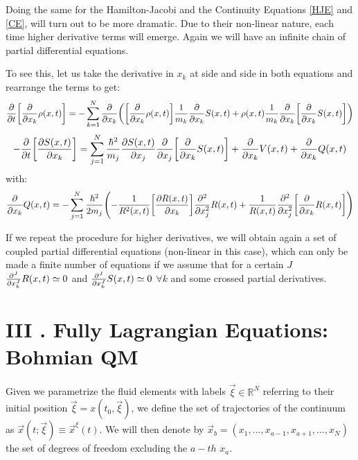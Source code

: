 \documentclass[11pt, a4paper]{article} %
\newcommand{\R}{\mathbb{R}} %
\begin{document}
Doing the same for the Hamilton-Jacobi and the Continuity Equations \eqref{HJE} and \eqref{CE}, will turn out to be more dramatic. Due to their non-linear nature, each time higher derivative terms will emerge. Again we will have an infinite chain of partial differential equations.

To see this, let us take the derivative in $x_k$ at side and side in both equations and rearrange the terms to get:
\begin{equation}
\pdv{}{t} \qty[\pdv{}{x_k}\rho(x,t)]=-\sum_{k=1}^N \pdv{}{x_k}\qty( \qty[ \pdv{}{x_k}\rho(x,t)]\frac{1}{m_k}\pdv{}{x_k} S(x,t)+\rho(x,t)\frac{1}{m_k}\pdv{}{x_k} \qty[\pdv{}{x_k}S(x,t)] )
\end{equation}
\begin{equation}
-\pdv{}{t}\qty[\pdv{S(x,t)}{x_k}] = \sum_{j=1}^N \frac{\hbar^2}{m_j}\pdv{S(x,t)}{x_j} \pdv{}{x_j}\qty[\pdv{}{x_k} S(x,t) ]+ \pdv{}{x_k}V(x,t)+\pdv{}{x_k}Q(x,t)
\end{equation}
with:
\begin{equation}
\pdv{}{x_k}Q(x,t)=-\sum_{j=1}^N \frac{\hbar^2}{2m_j}\qty( -\frac{1}{R^2(x,t)}\qty[\pdv{R(x,t)}{x_k}]\pdv[2]{}{x_j} R(x,t)+\frac{1}{R(x,t)}\pdv[2]{}{x_j} \qty[\pdv{}{x_k}R(x,t)])
\end{equation}

If we repeat the procedure for higher derivatives, we will obtain again a set of coupled partial differential equations (non-linear in this case), which can only be made a finite number of equations if we assume that for a certain $J$ $\pdv[J]{}{x_k}R(x,t)\simeq 0$ and $\pdv[J]{}{x_k}S(x,t)\simeq 0$ $\forall k$ and some crossed partial derivatives.

\section*{III . Fully Lagrangian Equations: Bohmian QM}
Given we parametrize the fluid elements with labels $\vec{\xi}\in\R^N$ referring to their initial position $\vec{\xi}=x(t_0, \vec{\xi})$, we define the set of trajectories of the continuum as $\vec{x}(t;\vec{\xi}) \equiv \vec{x}^\xi(t)$. We will then denote by $\vec{x}_b=(x_1,...,x_{a-1}, x_{a+1},...,x_N)$ the set of degrees of freedom excluding the $a-th$ $x_a$.
\end{document}
